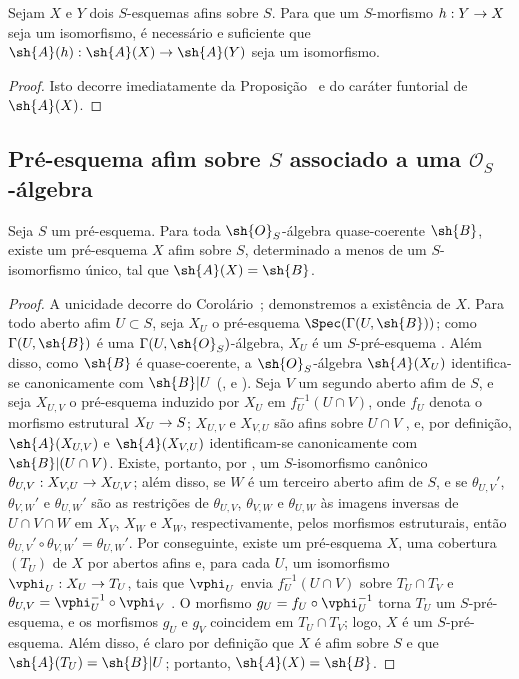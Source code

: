 \documentclass[oneside,10pt]{amsart}
\makeatletter
\newcommand{\ega@arrow}[2]{\mathchoice{#1}{#2}{#2}{#2}}
\renewcommand{\to}{\ega@arrow{\longrightarrow}{\rightarrow}}
\let\EGAOriginalLabel\label
\renewcommand{\label}[1]{\phantomsection\EGAOriginalLabel{#1}}
\makeatother
\begin{document}
\begin{corollary}[1.2.8]
\label{II.1.2.8}
Sejam $X$ e $Y$ dois $S$-esquemas afins sobre $S$.
Para que um $S$-morfismo $h:Y\to X$ seja um isomorfismo, é necessário e suficiente que $\sh{A}(h):\sh{A}(X)\to\sh{A}(Y)$ seja um isomorfismo.
\end{corollary}

\begin{proof}
Isto decorre imediatamente da Proposição~ e do caráter funtorial de $\sh{A}(X)$.
\end{proof}

\subsection{Pré-esquema afim sobre $S$ associado a uma $\mathcal{O}_S$-álgebra}
\label{subsection:II.1.3}
\label{II.1.3}

\begin{proposition}[1.3.1]
\label{II.1.3.1}
Seja $S$ um pré-esquema.
Para toda $\sh{O}_S$-álgebra quase-coerente $\sh{B}$, existe um pré-esquema $X$ afim sobre $S$, determinado a menos de um $S$-isomorfismo único, tal que $\sh{A}(X)=\sh{B}$.
\end{proposition}

\begin{proof}
A unicidade decorre do Corolário~; demonstremos a existência de $X$.
Para todo aberto afim $U\subset S$, seja $X_U$ o pré-esquema $\Spec(\Gamma(U,\sh{B}))$; como $\Gamma(U,\sh{B})$ é uma $\Gamma(U,\sh{O}_S)$-álgebra, $X_U$ é um $S$-pré-esquema .
Além disso, como $\sh{B}$ é quase-coerente, a $\sh{O}_S$-álgebra $\sh{A}(X_U)$ identifica-se canonicamente com $\sh{B}|U$ (,  e ).
Seja $V$ um segundo aberto afim de $S$, e seja $X_{U,V}$ o pré-esquema induzido por $X_U$ em $f_U^{-1}(U\cap V)$, onde $f_U$ denota o morfismo estrutural $X_U\to S$; $X_{U,V}$ e $X_{V,U}$ são afins sobre $U\cap V$ , e, por definição, $\sh{A}(X_{U,V})$ e $\sh{A}(X_{V,U})$ identificam-se canonicamente com $\sh{B}|(U\cap V)$.
Existe, portanto, por , um $S$-isomorfismo canônico $\theta_{U,V}:X_{V,U}\to X_{U,V}$; além disso, se $W$ é um terceiro aberto afim de $S$, e se $\theta_{U,V}'$, $\theta_{V,W}'$ e $\theta_{U,W}'$ são as restrições de $\theta_{U,V}$, $\theta_{V,W}$ e $\theta_{U,W}$ às imagens inversas de $U\cap V\cap W$ em $X_V$, $X_W$ e $X_W$, respectivamente, pelos morfismos estruturais, então $\theta_{U,V}'\circ\theta_{V,W}'=\theta_{U,W}'$.
Por conseguinte, existe um pré-esquema $X$, uma cobertura $(T_U)$ de $X$ por abertos afins e, para cada $U$, um isomorfismo $\vphi_U:X_U\to T_U$, tais que $\vphi_U$ envia $f_U^{-1}(U\cap V)$ sobre $T_U\cap T_V$ e $\theta_{U,V}=\vphi_U^{-1}\circ\vphi_V$ .
O morfismo $g_U=f_U\circ\vphi_U^{-1}$ torna $T_U$ um $S$-pré-esquema, e os morfismos $g_U$ e $g_V$ coincidem em $T_U\cap T_V$; logo, $X$ é um $S$-pré-esquema.
Além disso, é claro por definição que $X$ é afim sobre $S$ e que $\sh{A}(T_U)=\sh{B}|U$; portanto, $\sh{A}(X)=\sh{B}$.
\end{proof}
\end{document}
